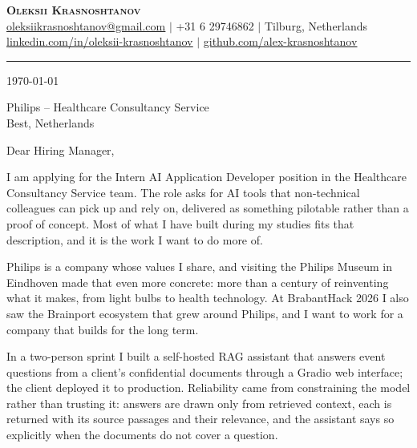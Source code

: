 \documentclass[letterpaper,11pt]{article}
\begin{document}
\begin{center}
    \textbf{\Huge \scshape Oleksii Krasnoshtanov} \\ \vspace{1pt}
    \small
    \href{mailto:oleksiikrasnoshtanov@gmail.com}{\underline{oleksiikrasnoshtanov@gmail.com}} $|$
    +31 6 29746862 $|$
    Tilburg, Netherlands \\ \vspace{2pt}
    \href{https://www.linkedin.com/in/oleksii-krasnoshtanov/}{\underline{linkedin.com/in/oleksii-krasnoshtanov}} $|$
    \href{https://github.com/alex-krasnoshtanov}{\underline{github.com/alex-krasnoshtanov}}
\end{center}
\vspace{-4pt}\noindent\rule{\textwidth}{0.4pt}

\today

Philips -- Healthcare Consultancy Service \\
Best, Netherlands

Dear Hiring Manager,

I am applying for the Intern AI Application Developer position in the
Healthcare Consultancy Service team. The role asks for AI tools that
non-technical colleagues can pick up and rely on, delivered as something
pilotable rather than a proof of concept. Most of what I have built during my
studies fits that description, and it is the work I want to do more of.

Philips is a company whose values I share, and visiting the Philips Museum in
Eindhoven made that even more concrete: more than a century of reinventing what it makes,
from light bulbs to health technology. At BrabantHack 2026 I also saw the
Brainport ecosystem that grew around Philips, and I want to work for a company
that builds for the long term.

In a two-person sprint I built a self-hosted RAG assistant that answers event
questions from a client's confidential documents through a Gradio web
interface; the client deployed it to production. Reliability came
from constraining the model rather than trusting it: answers are drawn only
from retrieved context, each is returned with its source passages and their
relevance, and the assistant says so explicitly when the documents do not
cover a question.
\end{document}
